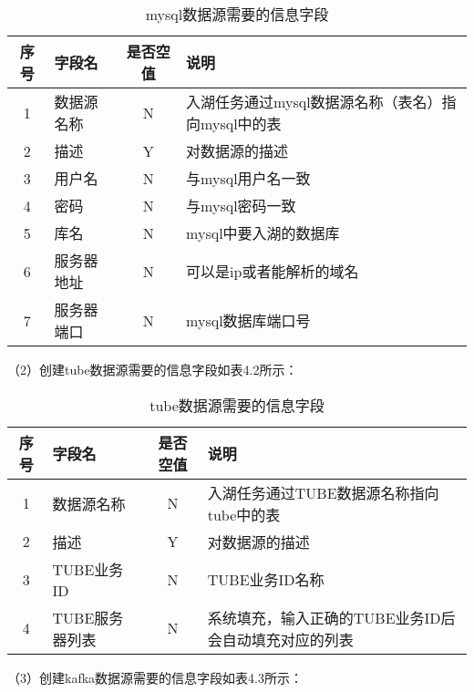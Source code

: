 \begin{table}[h]
  \centering
  \caption{mysql数据源需要的信息字段}
  \label{tab:exampletable}
  \begin{tabular}{clcl}
    \toprule
    序号  & 字段名     & 是否空值   & 说明    \\
    \midrule
    1    & 数据源名称  & N        & 入湖任务通过mysql数据源名称（表名）指向mysql中的表 \\
    2    & 描述       & Y        & 对数据源的描述                                \\
    3    & 用户名     & N        & 与mysql用户名一致                             \\
    4    & 密码       & N        &  与mysql密码一致                             \\
    5    & 库名       & N        &   mysql中要入湖的数据库                       \\
    6    & 服务器地址  & N        &  可以是ip或者能解析的域名                      \\
    7    & 服务器端口  & N        &   mysql数据库端口号                          \\
    \bottomrule
  \end{tabular}
\end{table}

（2）创建tube数据源需要的信息字段如表4.2所示：

\begin{table}[h]
  \centering
  \caption{tube数据源需要的信息字段}
  \label{tab:exampletable}
  \begin{tabular}{clcl}
    \toprule
    序号  & 字段名     & 是否空值   & 说明                                      \\
    \midrule
    1    & 数据源名称  & N        & 入湖任务通过TUBE数据源名称指向tube中的表 \\
    2    & 描述       & Y        & 对数据源的描述                                \\
    3    & TUBE业务ID     & N        & TUBE业务ID名称                             \\
    4    & TUBE服务器列表       & N        &  系统填充，输入正确的TUBE业务ID后会自动填充对应的列表         \\
    \bottomrule
  \end{tabular}
\end{table}

（3）创建kafka数据源需要的信息字段如表4.3所示：

